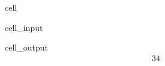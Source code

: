 \documentclass[letterpaper,10pt,english]{jupyterBook}
\begin{document}
\begin{sphinxuseclass}{cell}\begin{sphinxVerbatimInput}

\begin{sphinxuseclass}{cell_input}
\begin{sphinxVerbatim}[commandchars=\\\{\}]
\PYG{p}{[}\PYG{p}{]}
\end{sphinxVerbatim}

\end{sphinxuseclass}\end{sphinxVerbatimInput}
\begin{sphinxVerbatimOutput}

\begin{sphinxuseclass}{cell_output}\begin{equation*}
\begin{split}34\end{split}
\end{equation*}
\end{sphinxuseclass}\end{sphinxVerbatimOutput}

\end{sphinxuseclass}
\end{document}
